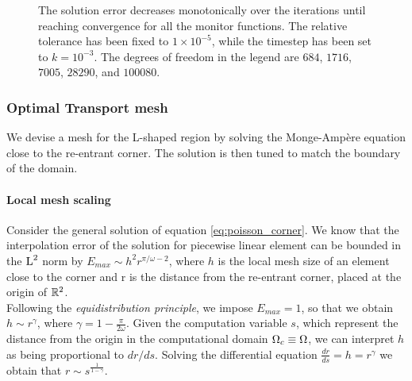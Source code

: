 \documentclass[a4paper,11pt]{article}
\begin{document}
{\begin{figure}[h!]
{}
\caption{The solution error decreases monotonically over the iterations until reaching convergence for all the monitor functions. The relative tolerance has been fixed to $1\times10^{-5}$, while the timestep has been set to $k=10^{-3}$. The degrees of freedom in the legend are $684$, $1716$, $7005$, $28290$, and $100080$.}
\end{figure}

\clearpage
\newpage

\subsubsection{Optimal Transport mesh}
\label{sec:OT}

We devise a mesh for the L-shaped region by solving the Monge-Ampère equation close to the re-entrant corner. The solution is then tuned to match the boundary of the domain.


\paragraph{Local mesh scaling}

Consider the general solution of equation \eqref{eq:poisson_corner}. We know that the interpolation error of the solution for piecewise linear element can be bounded in the $\operatorname L^{2}$ norm by $E_{max} \sim h^{2} r^{\pi/\omega - 2}$, where $h$ is the local mesh size of an element close to the corner and r is the distance from the re-entrant corner, placed at the origin of $\mathbb R^{2}$.\\

Following the \textit{equidistribution principle}, we impose $E_{max} = 1$, so that we obtain $h \sim r^{\gamma}$, where $\gamma = 1 - \frac{\pi}{2\omega}$. Given the computation variable $s$, which represent the distance from the origin in the computational domain $\Omega_{c} \equiv \Omega$, we can interpret $h$ as being proportional to $dr/ds$. Solving the differential equation $\frac{dr}{ds} = h = r^{\gamma}$ we obtain that $r \sim s^{\frac{1}{1-\gamma}}$.


}
\end{document}
